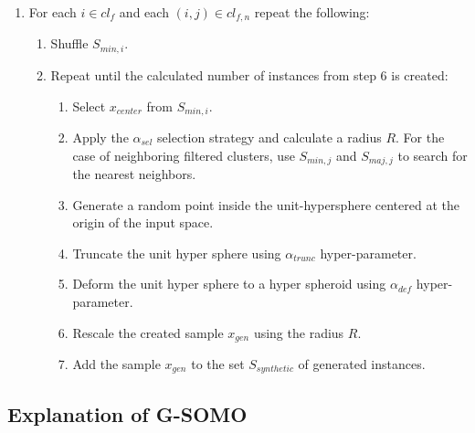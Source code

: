 \documentclass[parskip=full]{scrartcl}
\begin{document}
\begin{algorithm}[H]
\begin{enumerate}
		\item For each $i \in cl_{f}$ and each $(i, j) \in cl_{f, n}$ repeat the following:
		
		\begin{enumerate}[label*=\arabic*.]
			
			\item Shuffle $S_{min, i}$.
			
			\item Repeat until the calculated number of instances from step 6 is created:
			
			\begin{enumerate}[label*=\arabic*.]
				
				\item Select $x_{center}$ from $S_{min, i}$.
				
				\item Apply the $\alpha_{sel}$ selection strategy and calculate a radius $R$. For the case of neighboring filtered clusters, use $S_{min, j}$ and $S_{maj, j}$ to search for the nearest neighbors.
				
				\item Generate a random point inside the unit-hypersphere centered at the origin of the input space.
				
				\item Truncate the unit hyper sphere using $\alpha_{trunc}$ hyper-parameter.
				
				\item Deform the unit hyper sphere to a hyper spheroid using
				$\alpha_{def}$ hyper-parameter.
				
				\item Rescale the created sample $x_{gen}$ using the radius $R$.
				
				\item Add the sample $x_{gen}$ to the set $S_{synthetic}$ of generated instances.
			
			\end{enumerate}
		
		\end{enumerate}
	
	\end{enumerate}
	

\end{algorithm}

\subsection{Explanation of G-SOMO}
\end{document}
